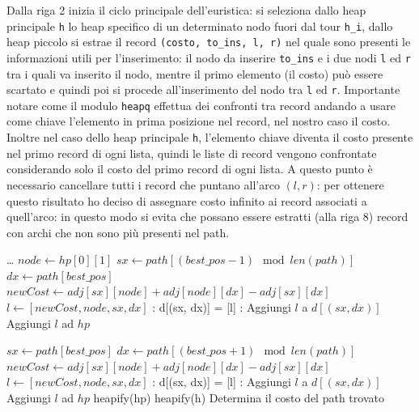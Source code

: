 \documentclass[a4paper,12pt]{report}
\begin{document}
Dalla riga 2 inizia il ciclo principale dell'euristica: si seleziona dallo heap principale \lstinline!h! lo heap specifico di un determinato nodo fuori dal tour \lstinline!h_i!, dallo heap piccolo si estrae il record \lstinline!(costo, to_ins, l, r)! nel quale sono presenti le informazioni utili per l'inserimento: il nodo da inserire \lstinline!to_ins! e i due nodi \lstinline!l! ed \lstinline!r! tra i quali va inserito il nodo, mentre il primo elemento (il costo) può essere scartato e quindi poi si procede all'inserimento del nodo tra \lstinline!l! ed \lstinline!r!. Importante notare come il modulo \lstinline!heapq! effettua dei confronti tra record andando a usare come chiave l'elemento in prima posizione nel record, nel nostro caso il costo. Inoltre nel caso dello heap principale \lstinline!h!, l'elemento chiave diventa il costo presente nel primo record di ogni lista, quindi le liste di record vengono confrontate considerando solo il costo del primo record di ogni lista. A questo punto è necessario cancellare tutti i record che puntano all'arco $(l, r)$: per ottenere questo risultato ho deciso di assegnare costo infinito ai record associati a quell'arco: in questo modo si evita che possano essere estratti (alla riga 8) record con archi che non sono più presenti nel path.
\begin{tcolorbox}[colframe=black, colback=white, boxrule=0.5pt, title=Cheapest Insertion Versione 3, coltitle=black, fonttitle=\bfseries, colbacktitle=white, breakable]
  \begin{algorithmic}[1]
      \State \dots
        \State $node \gets hp[0][1]$
        \State $sx \gets path[(best\_pos - 1) \mod len(path)]$
        \State $dx \gets path[best\_pos]$
        \State $newCost \gets adj[sx][node] + adj[node][dx] - adj[sx][dx]$
        \State $l \gets [newCost, node, sx, dx]$
        :
        \State d[(sx, dx)] = [l]
        \Else{}:
        \State Aggiungi $l$ a $d[(sx, dx)]$
        \EndIf
        \State Aggiungi $l$ ad $hp$
        
        \State $sx \gets path[best\_pos]$
        \State $dx \gets path[(best\_pos + 1) \mod len(path)]$
        \State $newCost \gets adj[sx][node] + adj[node][dx] - adj[sx][dx]$
        \State $l \gets [newCost, node, sx, dx]$
        :
            \State d[(sx, dx)] = [l]
        \Else{}:
            \State Aggiungi $l$ a $d[(sx, dx)]$
        \EndIf
        \State Aggiungi $l$ ad $hp$
        \State heapify(hp)
      \EndFor
      \State heapify(h)
    \EndWhile
    \State Determina il costo del path trovato
  \end{algorithmic}
\end{tcolorbox}
\end{document}
